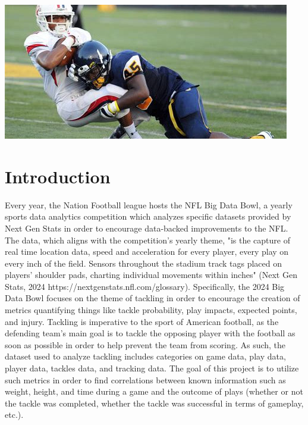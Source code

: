 \documentclass[sigconf, hyperref={colorlinks=true,linkcolor=blue,urlcolor=blue}]{acmart}
\begin{document}
\begin{teaserfigure}
  \includegraphics[width=\textwidth]{./th-4169371817}
  \label{fig:teaser}
\end{teaserfigure}


\maketitle

\section{Introduction}
Every year, the Nation Football league hosts the NFL Big Data Bowl, a yearly sports data analytics competition which analyzes specific datasets provided by Next Gen Stats in order to encourage data-backed improvements to the NFL. The data, which aligns with the competition's yearly theme, "is the capture of real time location data, speed and acceleration for every player, every play on every inch of the field. Sensors throughout the stadium track tags placed on players' shoulder pads, charting individual movements within inches" (Next Gen Stats, 2024 https://nextgenstats.nfl.com/glossary). Specifically, the 2024 Big Data Bowl focuses on the theme of tackling in order to encourage the creation of metrics quantifying things like tackle probability, play impacts, expected points, and injury. Tackling is imperative to the sport of American football, as the defending team's main goal is to tackle the opposing player with the football as soon as possible in order to help prevent the team from scoring. As such, the dataset used to analyze tackling includes categories on game data, play data, player data, tackles data, and tracking data. The goal of this project is to utilize such metrics in order to find correlations between known information such as weight, height, and time during a game and the outcome of plays (whether or not the tackle was completed, whether the tackle was successful in terms of gameplay, etc.). 
\end{document}
